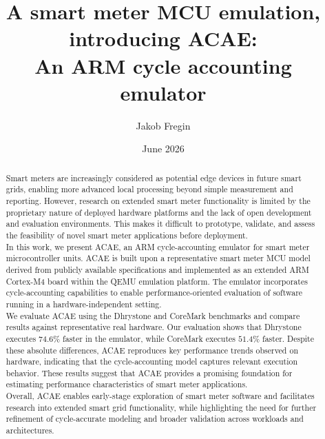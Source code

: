\documentclass[english]{tudscrartcl}
\begin{document}
	\title{A smart meter MCU emulation, introducing ACAE:\\An ARM cycle accounting emulator}
	\author{Jakob Fregin}
	\date{June 2026}

  	\maketitle
	
	\begin{abstract}
		Smart meters are increasingly considered as potential edge devices in future smart grids, enabling more advanced local processing beyond simple measurement and reporting.
		However, research on extended smart meter functionality is limited by the proprietary nature of deployed hardware platforms and the lack of open development and evaluation environments.
		This makes it difficult to prototype, validate, and assess the feasibility of novel smart meter applications before deployment.
		\\
		In this work, we present ACAE, an ARM cycle-accounting emulator for smart meter microcontroller units.
		ACAE is built upon a representative smart meter \ac{MCU} model derived from publicly available specifications and implemented as an extended ARM Cortex-M4 board within the QEMU emulation platform.
		The emulator incorporates cycle-accounting capabilities to enable performance-oriented evaluation of software running in a hardware-independent setting.
		\\
		We evaluate ACAE using the Dhrystone and CoreMark benchmarks and compare results against representative real hardware.
		Our evaluation shows that Dhrystone executes $74.6\%$ faster in the emulator, while CoreMark executes $51.4\%$ faster.
		Despite these absolute differences, ACAE reproduces key performance trends observed on hardware, indicating that the cycle-accounting model captures relevant execution behavior.
		These results suggest that ACAE provides a promising foundation for estimating performance characteristics of smart meter applications.
		\\
		Overall, ACAE enables early-stage exploration of smart meter software and facilitates research into extended smart grid functionality, while highlighting the need for further refinement of cycle-accurate modeling and broader validation across workloads and architectures.
		\\
	\end{abstract}
	
\end{document}
